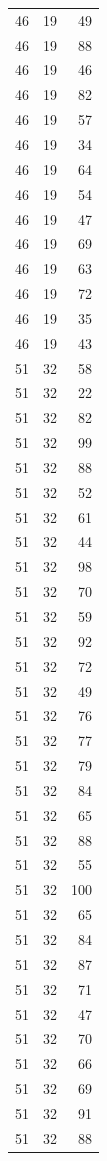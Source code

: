\documentclass[
  letterpaper,
  DIV=11,
  numbers=noendperiod]{scrreprt}
\renewcommand{\[}{\begin{equation}}
\renewcommand{\]}{\end{equation}}
\begin{document}
\begin{table}
\begin{tabular*}{\linewidth}{@{\extracolsep{\fill}}rrr}
46 & 19 & 49 \\ 
46 & 19 & 88 \\ 
46 & 19 & 46 \\ 
46 & 19 & 82 \\ 
46 & 19 & 57 \\ 
46 & 19 & 34 \\ 
46 & 19 & 64 \\ 
46 & 19 & 54 \\ 
46 & 19 & 47 \\ 
46 & 19 & 69 \\ 
46 & 19 & 63 \\ 
46 & 19 & 72 \\ 
46 & 19 & 35 \\ 
46 & 19 & 43 \\ 
51 & 32 & 58 \\ 
51 & 32 & 22 \\ 
51 & 32 & 82 \\ 
51 & 32 & 99 \\ 
51 & 32 & 88 \\ 
51 & 32 & 52 \\ 
51 & 32 & 61 \\ 
51 & 32 & 44 \\ 
51 & 32 & 98 \\ 
51 & 32 & 70 \\ 
51 & 32 & 59 \\ 
51 & 32 & 92 \\ 
51 & 32 & 72 \\ 
51 & 32 & 49 \\ 
51 & 32 & 76 \\ 
51 & 32 & 77 \\ 
51 & 32 & 79 \\ 
51 & 32 & 84 \\ 
51 & 32 & 65 \\ 
51 & 32 & 88 \\ 
51 & 32 & 55 \\ 
51 & 32 & 100 \\ 
51 & 32 & 65 \\ 
51 & 32 & 84 \\ 
51 & 32 & 87 \\ 
51 & 32 & 71 \\ 
51 & 32 & 47 \\ 
51 & 32 & 70 \\ 
51 & 32 & 66 \\ 
51 & 32 & 69 \\ 
51 & 32 & 91 \\ 
51 & 32 & 88 \\ 

\end{tabular*}
\end{table}
\end{document}
